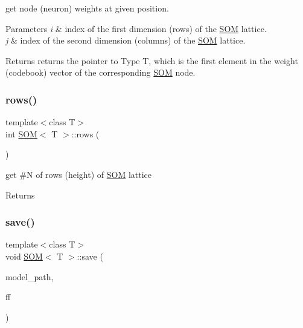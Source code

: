 get node (neuron) weights at given position. 


\begin{DoxyParams}{Parameters}
{\em i} & index of the first dimension (rows) of the \mbox{\hyperlink{class_s_o_m}{S\+OM}} lattice. \\
\hline
{\em j} & index of the second dimension (columns) of the \mbox{\hyperlink{class_s_o_m}{S\+OM}} lattice.\\
\hline
\end{DoxyParams}
\begin{DoxyReturn}{Returns}
returns the pointer to Type T, which is the first element in the weight (codebook) vector of the corresponding \mbox{\hyperlink{class_s_o_m}{S\+OM}} node.
\end{DoxyReturn}
\mbox{\label{class_s_o_m_ab56a48e18e8d571aa8f5f097810a20e8}} 
\subsubsection{\texorpdfstring{rows()}{rows()}}
{\footnotesize\ttfamily template$<$class T$>$ \\
int \mbox{\hyperlink{class_s_o_m}{S\+OM}}$<$ T $>$\+::rows (\begin{DoxyParamCaption}{ }\end{DoxyParamCaption})\hspace{0.3cm}{\ttfamily [inline]}}



get \#N of rows (height) of \mbox{\hyperlink{class_s_o_m}{S\+OM}} lattice 

\begin{DoxyReturn}{Returns}

\end{DoxyReturn}
\mbox{\label{class_s_o_m_a3969de21028793245f1b5e88a040f6b5}} 
\subsubsection{\texorpdfstring{save()}{save()}}
{\footnotesize\ttfamily template$<$class T$>$ \\
void \mbox{\hyperlink{class_s_o_m}{S\+OM}}$<$ T $>$\+::save (\begin{DoxyParamCaption}\item[{const std\+::string \&}]{model\+\_\+path,  }\item[{const \mbox{\hyperlink{_s_o_m_8h_a78e44725402091318ad38c42d5c34e69}{S\+O\+M\+File\+Format}} \&}]{ff }\end{DoxyParamCaption})\hspace{0.3cm}{\ttfamily [inline]}}



